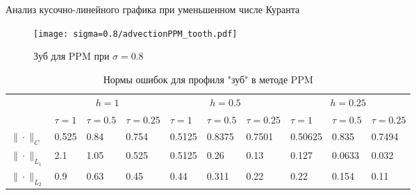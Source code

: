 \documentclass[unicode, 8pt]{beamer}
\begin{document}
    \begin{frame}{Анализ кусочно-линейного графика при уменьшенном числе Куранта}
        \begin{figure}[h]
            \centering
            \texttt{[image: sigma=0.8/advectionPPM\_tooth.pdf]}
            \caption{Зуб для PPM при $ \sigma = 0.8 $}
            \label{fig:ppm_tooth_08}
        \end{figure}
        \begin{table}[h]
            \centering
            \caption{Нормы ошибок для профиля "зуб" в методе PPM}
            \label{table:toothPPM}
            \scalebox{0.75} {
                \begin{tabular}{|*{10}{C{.45in}|}}
                    \hline
                    &  &  &  \\
                    & $\tau=1$ & $\tau=0.5$ & $\tau=0.25$ & $\tau=1$ & $\tau=0.5$ & $\tau=0.25$ & $\tau=1$ & $\tau=0.5$ & $\tau=0.25$ 
                    \\ \hline
                    $\| \cdot \|_{C}$ & 0.525 & 0.84 & 0.754 & 0.5125 & 0.8375 & 0.7501 & 0.50625 & 0.835 & 0.7494 
                    \\ \hline
                    $\| \cdot \|_{L_1}$ & 2.1 & 1.05 & 0.525 & 0.5125 & 0.26 & 0.13 & 0.127 & 0.0633 & 0.032
                    \\ \hline
                    $\| \cdot \|_{L_2}$ & 0.9 & 0.63 & 0.45 & 0.44 & 0.311 & 0.22 & 0.22 & 0.154 & 0.11
                    \\ \hline
                \end{tabular}
            }
        \end{table}
    \end{frame}
\end{document}
